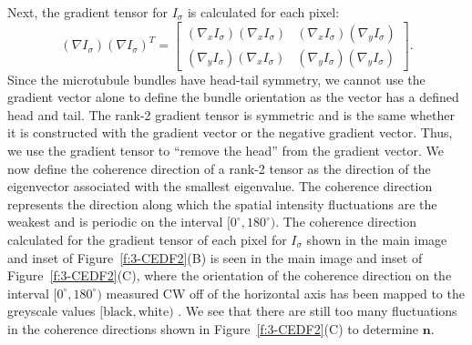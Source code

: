 Next, the gradient tensor for $I_{\sigma}$ is calculated for each pixel:
\begin{equation}
(\nabla I_{\sigma})(\nabla I_{\sigma})^T =
\begin{bmatrix}
(\nabla_x I_{\sigma})(\nabla_x I_{\sigma}) & (\nabla_x I_{\sigma})(\nabla_y I_{\sigma}) \\
(\nabla_y I_{\sigma})(\nabla_x I_{\sigma}) & (\nabla_y I_{\sigma})(\nabla_y I_{\sigma})
\end{bmatrix}.
\end{equation}
Since the microtubule bundles have head-tail symmetry, we cannot use the gradient vector alone to define the bundle orientation as the vector has a defined head and tail.
The rank-2 gradient tensor is symmetric and is the same whether it is constructed with the gradient vector or the negative gradient vector.
Thus, we use the gradient tensor to ``remove the head'' from the gradient vector.
We now define the coherence direction of a rank-2 tensor as the direction of the eigenvector associated with the smallest eigenvalue.
The coherence direction represents the direction along which the spatial intensity fluctuations are the weakest and is periodic on the interval $[0^{\circ}, 180^{\circ})$.
The coherence direction calculated for the gradient tensor of each pixel for $I_\sigma$ shown in the main image and inset of Figure~\ref{f:3-CEDF2}(B) is seen in the main image and inset of Figure~\ref{f:3-CEDF2}(C), where the orientation of the coherence direction on the interval $[0^{\circ}, 180^{\circ})$ measured CW off of the horizontal axis has been mapped to the greyscale values $[\textrm{black}, \textrm{white})$ .
We see that there are still too many fluctuations in the coherence directions shown in Figure~\ref{f:3-CEDF2}(C) to determine $\mathbf{n}$.\\

